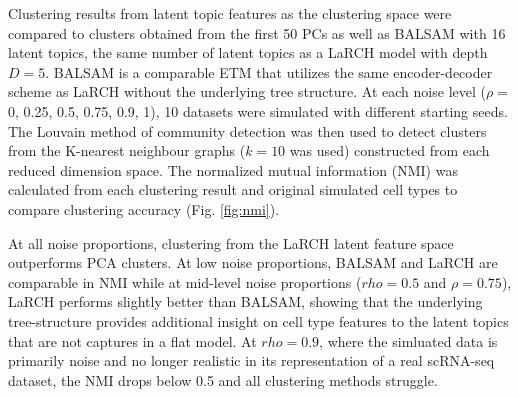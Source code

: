Clustering results from latent topic features as the clustering space were compared to clusters obtained from the first 50 PCs as well as BALSAM \cite{ZHANG2023100388} with 16 latent topics, the same number of latent topics as a LaRCH model with depth $D = 5$. BALSAM is a comparable ETM that utilizes the same encoder-decoder scheme as LaRCH without the underlying tree structure. At each noise level ($\rho =$ 0, 0.25, 0.5, 0.75, 0.9, 1), 10 datasets were simulated with different starting seeds. The Louvain method of community detection \cite{louvain} was then used to detect clusters from the K-nearest neighbour graphs ($k = 10$ was used) constructed from each reduced dimension space. The normalized mutual information (NMI) was calculated from each clustering result and original simulated cell types to compare clustering accuracy (Fig. \ref{fig:nmi}). 

At all noise proportions, clustering from the LaRCH latent feature space outperforms PCA clusters. At low noise proportions, BALSAM and LaRCH are comparable in NMI while at mid-level noise proportions ($rho = 0.5$ and $\rho = 0.75$), LaRCH performs slightly better than BALSAM, showing that the underlying tree-structure provides additional insight on cell type features to the latent topics that are not captures in a flat model. At $rho = 0.9$, where the simluated data is primarily noise and no longer realistic in its representation of a real scRNA-seq dataset, the NMI drops below 0.5 and all clustering methods struggle. 

